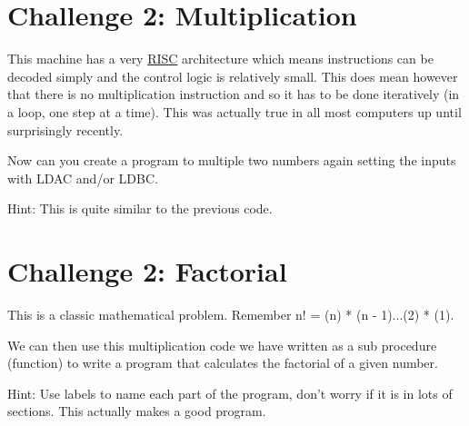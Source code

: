 \documentclass[10pt,a4paper]{article}
\begin{document}
\section{Challenge 2: Multiplication}
This machine has a very \href{https://en.wikipedia.org/wiki/Reduced_instruction_set_computing}{RISC} architecture which means instructions can be decoded simply and the control
logic is relatively small. This does mean however that there is no multiplication instruction and so it has to be
done iteratively (in a loop, one step at a time). This was actually true in all most computers up until surprisingly recently.

Now can you create a program to multiple two numbers again setting the inputs with LDAC and/or LDBC.

Hint: This is quite similar to the previous code.

\section{Challenge 2: Factorial}

This is a classic mathematical problem. Remember n! = (n) * (n - 1)...(2) * (1).

We can then use this multiplication code we have written as a sub procedure (function) to write a program that calculates the factorial of a
given number.

Hint: Use labels to name each part of the program, don't worry if it is in lots of sections. This actually makes a good program.
\end{document}

